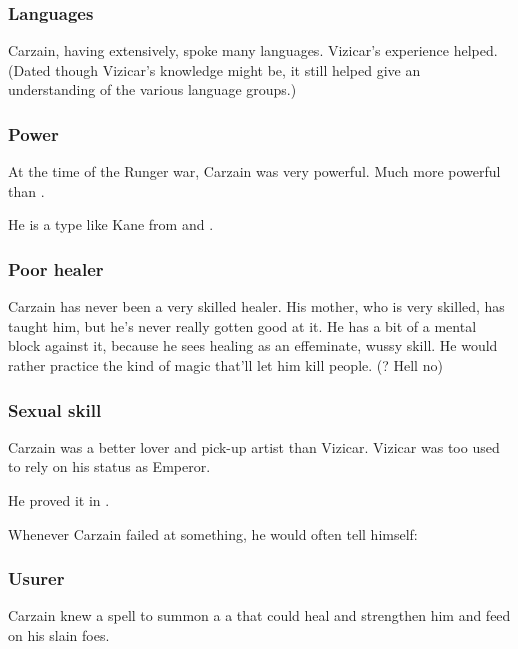 \subsubsection{Languages}
Carzain, having \travelled extensively, spoke many languages. 
Vizicar's experience helped. 
(Dated though Vizicar's knowledge might be, it still helped give an understanding of the various language groups.)





\subsubsection{Power}
At the time of the Runger war, Carzain was very powerful. 
Much more powerful than . 

He is a type like Kane from \cite{KarlEdwardWagner:GodsInDarkness} and \cite{KarlEdwardWagner:MidnightSun}. 





\subsubsection{Poor healer}
Carzain has never been a very skilled healer. 
His mother, who is very skilled, has taught him, but he's never really gotten good at it. 
He has a bit of a mental block against it, because he sees healing as an effeminate, wussy skill. 
He would rather practice the kind of magic that'll let him kill people. 
(? Hell no\prikker)




\subsubsection{Sexual skill}
Carzain was a better lover and pick-up artist than Vizicar. 
Vizicar was too used to rely on his status as Emperor. 

He proved it in . 

Whenever Carzain failed at something, he would often tell himself: 





\subsubsection{Usurer}
Carzain knew a spell to summon a \dash a \daemon that could heal and strengthen him and feed on his slain foes. 





